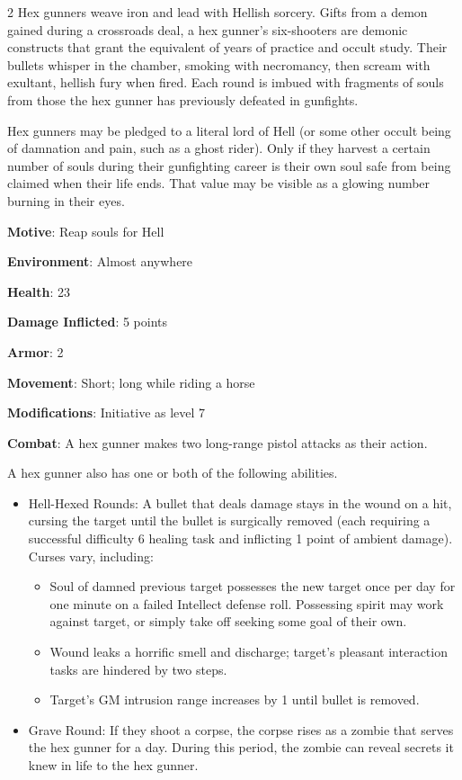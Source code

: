\begin{multicols}{2}
Hex gunners weave iron and lead with Hellish sorcery. Gifts from a demon gained during a crossroads deal, a hex gunner’s six-shooters are demonic constructs that grant the equivalent of years of practice and occult study. Their bullets whisper in the chamber, smoking with necromancy, then scream with exultant, hellish fury when fired. Each round is imbued with fragments of souls from those the hex gunner has previously defeated in gunfights. 

Hex gunners may be pledged to a literal lord of Hell (or some other occult being of damnation and pain, such as a ghost rider). Only if they harvest a certain number of souls during their gunfighting career is their own soul safe from being claimed when their life ends. That value may be visible as a glowing number burning in their eyes.

\textbf{Motive}: Reap souls for Hell 

\textbf{Environment}: Almost anywhere 

\textbf{Health}: 23 

\textbf{Damage Inflicted}: 5 points 

\textbf{Armor}: 2 

\textbf{Movement}: Short; long while riding a horse 

\textbf{Modifications}: Initiative as level 7 

\textbf{Combat}: A hex gunner makes two long-range pistol attacks as their action. 

A hex gunner also has one or both of the following abilities.

\begin{itemize}
\item	Hell-Hexed Rounds: A bullet that deals damage stays in the wound on a hit, cursing the target until the bullet is surgically removed (each requiring a successful difficulty 6 healing task and inflicting 1 point of ambient damage). Curses vary, including: 
\begin{itemize}
\item	Soul of damned previous target possesses the new target once per day for one minute on a failed Intellect defense roll. Possessing spirit may work against target, or simply take off seeking some goal of their own. 
\item	Wound leaks a horrific smell and discharge; target’s pleasant interaction tasks are hindered by two steps. 
\item	Target’s GM intrusion range increases by 1 until bullet is removed. 
\end{itemize}
\item	Grave Round: If they shoot a corpse, the corpse rises as a zombie that serves the hex gunner for a day. During this period, the zombie can reveal secrets it knew in life to the hex gunner. 
\end{itemize}


\end{multicols}
